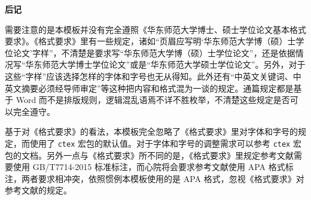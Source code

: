 \newpage
{}
{}
\thispagestyle{plain}
\centerline{\Large \bf 后记}\label{后记}

\vspace{0.5cm}
需要注意的是本模板并没有完全遵照《华东师范大学博士、硕士学位论文基本格式要求》。《格式要求》里有一些规定，诸如“页眉应写明‘华东师范大学博（硕）士学位论文’字样”，不清楚是要求写“华东师范大学博（硕）士学位论文”，还是依据情况写“华东师范大学博士学位论文”或是“华东师范大学硕士学位论文”。另外，对于这些“字样”应该选择怎样的字体和字号也无从得知。此外还有“中英文关键词、中英文摘要必须经导师审定”等这种把内容和格式混为一谈的规定。通篇规定都是基于 Word 而不是排版规则，逻辑混乱语焉不详不胜枚举，不清楚这些规定是否可以完全遵守。

基于对《格式要求》的看法，本模板完全忽略了《格式要求》里对字体和字号的规定，而使用了 \texttt{ctex} 宏包的默认值。对于字体和字号的调整需求可以参考 \texttt{ctex} 宏包的文档。另外一点与《格式要求》所不同的是，《格式要求》里规定参考文献需要使用 GB/T7714-2015 标准标注，而心院将会要求参考文献使用 APA 格式标注，两者要求相冲突，依照惯例本模板使用的是 APA 格式，忽视《格式要求》对参考文献的规定。
